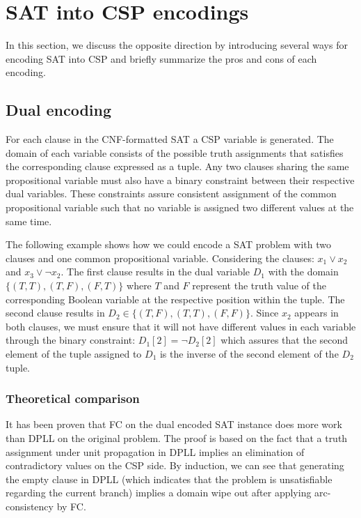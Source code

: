 \section{SAT into CSP encodings}\label{sec:sat_to_csp}
In this section, we discuss the opposite direction by introducing several ways for encoding SAT into CSP and briefly summarize the pros and cons of each encoding.

\subsection{Dual encoding}
For each clause in the CNF-formatted SAT a CSP variable is generated. The domain of each variable consists of the possible truth assignments that satisfies the corresponding clause expressed as a tuple. Any two clauses sharing the same propositional variable must also have a binary constraint between their respective dual variables. These constraints assure consistent assignment of the common propositional variable such that no variable is assigned two different values at the same time. 

The following example shows how we could encode a SAT problem with two clauses and one common propositional variable. Considering the clauses: $x_1 \vee x_2$ and $x_3 \vee \neg x_2$. The first clause results in the dual variable $D_1$ with the domain $\{(T,T),(T,F),(F,T)\}$ where $T$ and $F$ represent the truth value of the corresponding Boolean variable at the respective position within the tuple. The second clause results in $D_2 \in \{(T,F),(T,T),(F,F)\}$. Since $x_2$ appears in both clauses, we must ensure that it will not have different values in each variable through the binary constraint: $D_1[2] = \neg D_2[2]$ which assures that the second element of the tuple assigned to $D_1$ is the inverse of the second element of the $D_2$ tuple.

\subsubsection{Theoretical comparison}
It has been proven \cite{walsh2000sat} that FC on the dual encoded SAT instance does more work than DPLL on the original problem. The proof is based on the fact that a truth assignment under unit propagation in DPLL implies an elimination of contradictory values on the CSP side. By induction, we can see that generating the empty clause in DPLL (which indicates that the problem is unsatisfiable regarding the current branch) implies a domain wipe out after applying arc-consistency by FC.

